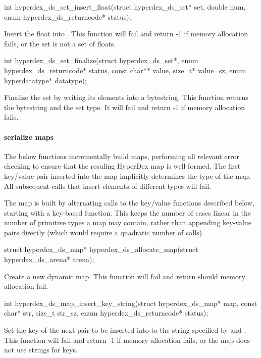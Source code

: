 \funcsep
\begin{ccode}
int hyperdex_ds_set_insert_float(struct hyperdex_ds_set* set, double num,
                                 enum hyperdex_ds_returncode* status);
\end{ccode}
\funcdesc Insert the float  into .  This function will fail
and return -1 if memory allocation fails, or the set is not a set of floats.

\funcsep
\begin{ccode}
int hyperdex_ds_set_finalize(struct hyperdex_ds_set*,
                             enum hyperdex_ds_returncode* status,
                             const char** value, size_t* value_sz,
                             enum hyperdatatype* datatype);
\end{ccode}
\funcdesc Finalize the set by writing its elements into a bytestring.  This
function returns the bytestring and the set type.  It will fail and return -1 if
memory allocation fails.

\paragraph{serialize maps}

The below functions incrementally build maps, performing all relevant error
checking to ensure that the resuling HyperDex map is well-formed.  The first
key/value-pair inserted into the map implicitly determines the type of the map.  All
subsequent calls that insert elements of different types will fail.

The map is built by alternating calls to the key/value functions described
below, starting with a key-based function.  This keeps the number of cases
linear in the number of primitive types a map may contain, rather than appending
key-value pairs directly (which would require a quadratic number of calls).

\begin{ccode}
struct hyperdex_ds_map* hyperdex_ds_allocate_map(struct hyperdex_ds_arena* arena);
\end{ccode}
\funcdesc Create a new dynamic map.  This function will fail and return
 should memory allocation fail.

\funcsep
\begin{ccode}
int hyperdex_ds_map_insert_key_string(struct hyperdex_ds_map* map,
                                      const char* str, size_t str_sz,
                                      enum hyperdex_ds_returncode* status);
\end{ccode}
\funcdesc Set the key of the next pair to be inserted into  to the
string specified by  and .  This function will fail and
return -1 if memory allocation fails, or the map does not use strings for keys.

